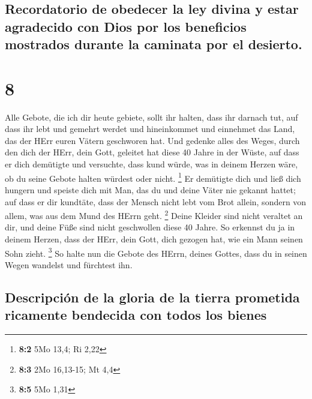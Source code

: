 \hypertarget{recordatorio-de-obedecer-la-ley-divina-y-estar-agradecido-con-dios-por-los-beneficios-mostrados-durante-la-caminata-por-el-desierto.}{%
\subsection{Recordatorio de obedecer la ley divina y estar agradecido
con Dios por los beneficios mostrados durante la caminata por el
desierto.}\label{recordatorio-de-obedecer-la-ley-divina-y-estar-agradecido-con-dios-por-los-beneficios-mostrados-durante-la-caminata-por-el-desierto.}}

\hypertarget{section-7}{%
\section{8}\label{section-7}}

 Alle Gebote, die ich dir heute gebiete, sollt ihr halten,
dass ihr darnach tut, auf dass ihr lebt und gemehrt werdet und
hineinkommet und einnehmet das Land, das der HErr euren Vätern
geschworen hat.  Und gedenke alles des Weges, durch den
dich der HErr, dein Gott, geleitet hat diese 40 Jahre in der Wüste, auf
dass er dich demütigte und versuchte, dass kund würde, was in deinem
Herzen wäre, ob du seine Gebote halten würdest oder nicht. \footnote{\textbf{8:2}
  5Mo 13,4; Ri 2,22}  Er demütigte dich und ließ dich
hungern und speiste dich mit Man, das du und deine Väter nie gekannt
hattet; auf dass er dir kundtäte, dass der Mensch nicht lebt vom Brot
allein, sondern von allem, was aus dem Mund des HErrn geht. \footnote{\textbf{8:3}
  2Mo 16,13-15; Mt 4,4}  Deine Kleider sind nicht veraltet
an dir, und deine Füße sind nicht geschwollen diese 40 Jahre.
 So erkennst du ja in deinem Herzen, dass der HErr, dein
Gott, dich gezogen hat, wie ein Mann seinen Sohn zieht. \footnote{\textbf{8:5}
  5Mo 1,31}  So halte nun die Gebote des HErrn, deines
Gottes, dass du in seinen Wegen wandelst und fürchtest ihn.

\hypertarget{descripciuxf3n-de-la-gloria-de-la-tierra-prometida-ricamente-bendecida-con-todos-los-bienes}{%
\subsection{Descripción de la gloria de la tierra prometida ricamente
bendecida con todos los
bienes}\label{descripciuxf3n-de-la-gloria-de-la-tierra-prometida-ricamente-bendecida-con-todos-los-bienes}}

